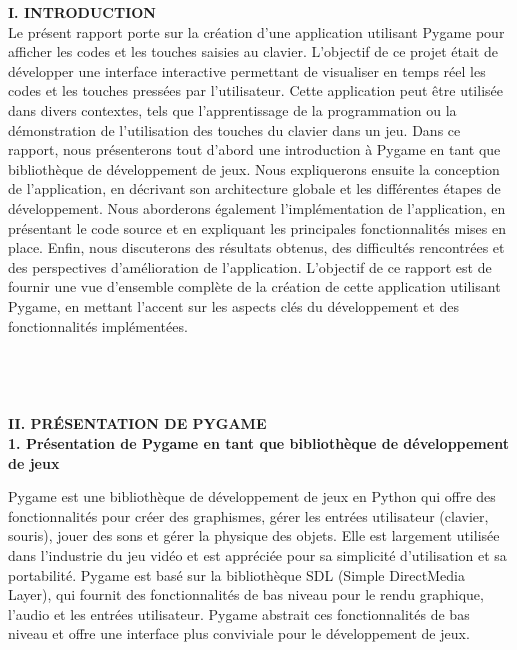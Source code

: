 \documentclass[a4paper, 12px]{article}
\begin{document}
{\bfseries I. INTRODUCTION}\\

Le présent rapport porte sur la création d'une application utilisant Pygame pour afficher les codes et les touches saisies au clavier. L'objectif de ce projet était de développer une interface interactive permettant de visualiser en temps réel les codes et les touches pressées par l'utilisateur. Cette application peut être utilisée dans divers contextes, tels que l'apprentissage de la programmation ou la démonstration de l'utilisation des touches du clavier dans un jeu.
Dans ce rapport, nous présenterons tout d'abord une introduction à Pygame en tant que bibliothèque de développement de jeux. Nous expliquerons ensuite la conception de l'application, en décrivant son architecture globale et les différentes étapes de développement. Nous aborderons également l'implémentation de l'application, en présentant le code source et en expliquant les principales fonctionnalités mises en place. Enfin, nous discuterons des résultats obtenus, des difficultés rencontrées et des perspectives d'amélioration de l'application.
L'objectif de ce rapport est de fournir une vue d'ensemble complète de la création de cette application utilisant Pygame, en mettant l'accent sur les aspects clés du développement et des fonctionnalités implémentées.\\
\\
\\
\\
\\
{\bfseries \MakeUppercase{II. Présentation de Pygame} \\

1.	Présentation de Pygame en tant que bibliothèque de développement de jeux\\}

Pygame est une bibliothèque de développement de jeux en Python qui offre des fonctionnalités pour créer des graphismes, gérer les entrées utilisateur (clavier, souris), jouer des sons et gérer la physique des objets. Elle est largement utilisée dans l'industrie du jeu vidéo et est appréciée pour sa simplicité d'utilisation et sa portabilité.
Pygame est basé sur la bibliothèque SDL (Simple DirectMedia Layer), qui fournit des fonctionnalités de bas niveau pour le rendu graphique, l'audio et les entrées utilisateur. Pygame abstrait ces fonctionnalités de bas niveau et offre une interface plus conviviale pour le développement de jeux.\\
\end{document}
